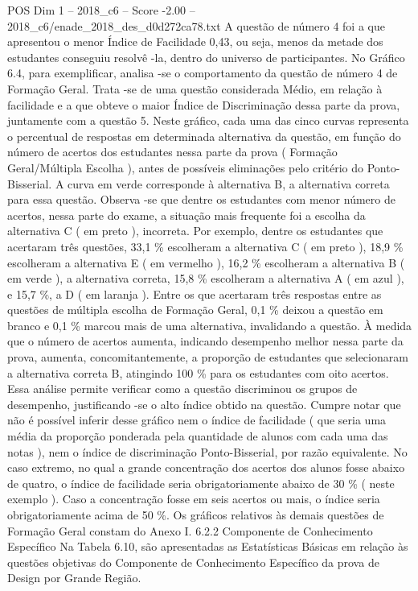 \begin{textsample}{POS Dim 1 – 2018\_c6 – Score -2.00 – 2018\_c6/enade\_2018\_des\_d0d272ca78.txt}
A questão de número 4 foi a que apresentou o menor Índice de Facilidade 0,43, ou seja, menos da metade dos estudantes conseguiu resolvê -la, dentro do universo de participantes.
No Gráfico 6.4, para exemplificar, analisa -se o comportamento da questão de número 4 de Formação Geral.
Trata -se de uma questão considerada Médio, em relação à facilidade e a que obteve o maior Índice de Discriminação dessa parte da prova, juntamente com a questão 5.
Neste gráfico, cada uma das cinco curvas representa o percentual de respostas em determinada alternativa da questão, em função do número de acertos dos estudantes nessa parte da prova ( Formação Geral/Múltipla Escolha ), antes de possíveis eliminações pelo critério do Ponto-Bisserial.
A curva em verde corresponde à alternativa B, a alternativa correta para essa questão.
Observa -se que dentre os estudantes com menor número de acertos, nessa parte do exame, a situação mais frequente foi a escolha da alternativa C ( em preto ), incorreta.
Por exemplo, dentre os estudantes que acertaram três questões, 33,1 \% escolheram a alternativa C ( em preto ), 18,9 \% escolheram a alternativa E ( em vermelho ), 16,2 \% escolheram a alternativa B ( em verde ), a alternativa correta, 15,8 \% escolheram a alternativa A ( em azul ), e 15,7 \%, a D ( em laranja ).
Entre os que acertaram três respostas entre as questões de múltipla escolha de Formação Geral, 0,1 \% deixou a questão em branco e 0,1 \% marcou mais de uma alternativa, invalidando a questão.
À medida que o número de acertos aumenta, indicando desempenho melhor nessa parte da prova, aumenta, concomitantemente, a proporção de estudantes que selecionaram a alternativa correta B, atingindo 100 \% para os estudantes com oito acertos.
Essa análise permite verificar como a questão discriminou os grupos de desempenho, justificando -se o alto índice obtido na questão.
Cumpre notar que não é possível inferir desse gráfico nem o índice de facilidade ( que seria uma média da proporção ponderada pela quantidade de alunos com cada uma das notas ), nem o índice de discriminação Ponto-Bisserial, por razão equivalente.
No caso extremo, no qual a grande concentração dos acertos dos alunos fosse abaixo de quatro, o índice de facilidade seria obrigatoriamente abaixo de 30 \% ( neste exemplo ).
Caso a concentração fosse em seis acertos ou mais, o índice seria obrigatoriamente acima de 50 \%.
Os gráficos relativos às demais questões de Formação Geral constam do Anexo I. 6.2.2 Componente de Conhecimento Específico Na Tabela 6.10, são apresentadas as Estatísticas Básicas em relação às questões objetivas do Componente de Conhecimento Específico da prova de Design por Grande Região.

\end{textsample}
